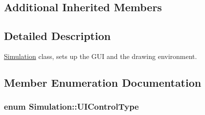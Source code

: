 \subsection*{Additional Inherited Members}


\subsection{Detailed Description}
\hyperlink{classSimulation}{Simulation} class, sets up the G\-U\-I and the drawing environment. 

\subsection{Member Enumeration Documentation}
\hypertarget{classSimulation_a0fd1c91d4e7699e893929d56b60a60bf}{
\subsubsection[{U\-I\-Control\-Type}]{\setlength{\rightskip}{0pt plus 5cm}enum {\bf Simulation\-::\-U\-I\-Control\-Type}}}\label{classSimulation_a0fd1c91d4e7699e893929d56b60a60bf}
